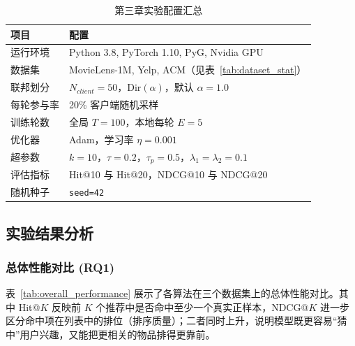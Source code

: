 \begin{table}[H]
    \centering
    \caption{第三章实验配置汇总}
    \label{tab:exp_config_chap3}
    \begin{tabular}{ll}
        \toprule
        项目 & 配置 \\
        \midrule
        运行环境 & Python 3.8, PyTorch 1.10, PyG, Nvidia GPU \\
        数据集 & MovieLens-1M, Yelp, ACM（见表~\ref{tab:dataset_stat}） \\
        联邦划分 & $N_{client}=50$，$\text{Dir}(\alpha)$，默认 $\alpha=1.0$ \\
        每轮参与率 & 20\% 客户端随机采样 \\
        训练轮数 & 全局 $T=100$，本地每轮 $E=5$ \\
        优化器 & Adam，学习率 $\eta=0.001$ \\
        超参数 & $k=10$，$\tau=0.2$，$\tau_p=0.5$，$\lambda_1=\lambda_2=0.1$ \\
        评估指标 & Hit@10 与 Hit@20，NDCG@10 与 NDCG@20 \\
        随机种子 & \texttt{seed=42} \\
        \bottomrule
    \end{tabular}
\end{table}

\subsection{实验结果分析}

\subsubsection{总体性能对比 (RQ1)}
\label{subsubsec:overall_performance}

表~\ref{tab:overall_performance} 展示了各算法在三个数据集上的总体性能对比。其中 Hit@$K$ 反映前 $K$ 个推荐中是否命中至少一个真实正样本，NDCG@$K$ 进一步区分命中项在列表中的排位（排序质量）；二者同时上升，说明模型既更容易“猜中”用户兴趣，又能把更相关的物品排得更靠前。

